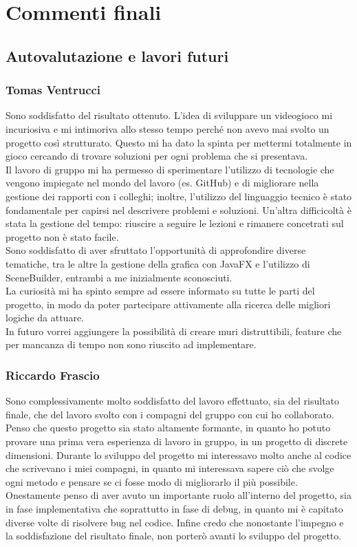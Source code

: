 \documentclass[a4paper,12pt]{report}
\begin{document}
\chapter{Commenti finali}
\section{Autovalutazione e lavori futuri}
\subsection*{Tomas Ventrucci}
Sono soddisfatto del risultato ottenuto. L’idea di sviluppare un videogioco mi incuriosiva e mi intimoriva allo stesso tempo perché non avevo mai svolto un progetto così strutturato. Questo mi ha dato la spinta per mettermi totalmente in gioco cercando di trovare soluzioni per ogni problema che si presentava.\\ 
Il lavoro di gruppo mi ha permesso di sperimentare l’utilizzo di tecnologie che vengono impiegate nel mondo del lavoro (es. GitHub) e di migliorare nella gestione dei rapporti con i colleghi; inoltre, l'utilizzo del linguaggio tecnico è stato fondamentale per capirsi nel descrivere problemi e soluzioni. Un'altra difficicoltà è stata la gestione del tempo: riuscire a seguire le lezioni e rimanere concetrati sul progetto non è stato facile.\\
Sono soddisfatto di aver sfruttato l'opportunità di approfondire diverse tematiche, tra le altre la gestione della grafica con JavaFX e l’utilizzo di SceneBuilder, entrambi a me inizialmente sconosciuti.\\
La curiosità mi ha spinto sempre ad essere informato su tutte le parti del progetto, in modo da poter partecipare attivamente alla ricerca delle migliori logiche da attuare.\\
In futuro vorrei aggiungere la possibilità di creare muri distruttibili, feature che per mancanza di tempo non sono riuscito ad implementare.
\newpage
\subsection*{Riccardo Frascio}
Sono complessivamente molto soddisfatto del lavoro effettuato, sia del risultato finale, che del lavoro svolto con i compagni del gruppo con cui ho collaborato. Penso che questo progetto sia stato altamente formante, in quanto ho potuto provare una prima vera esperienza di lavoro in gruppo, in un progetto di discrete dimensioni. Durante lo sviluppo del progetto mi interessavo molto anche al codice che scrivevano i miei compagni, in quanto mi interessava sapere ciò che svolge ogni metodo e pensare se ci fosse modo di migliorarlo il più possibile. Onestamente penso di aver avuto un importante ruolo all’interno del progetto, sia in fase implementativa che  soprattutto in fase di debug, in quanto mi è capitato diverse volte di risolvere bug nel codice. Infine credo che nonostante l’impegno e la soddisfazione del risultato finale, non porterò avanti lo sviluppo del progetto.
\end{document}

